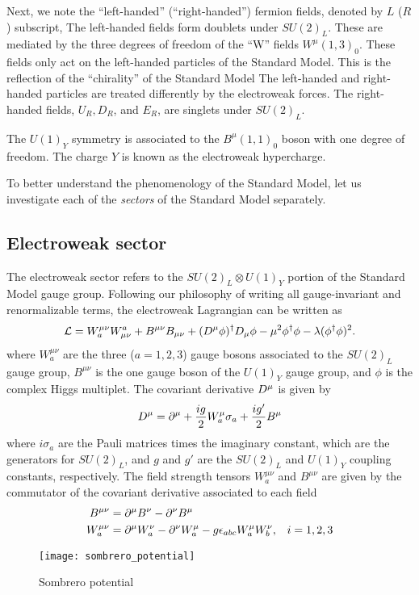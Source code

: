 Next, we note the ``left-handed'' (``right-handed'') fermion fields, denoted by $L$ ($R$) subscript,
The left-handed fields form doublets under $SU(2)_L$.
These are mediated by the three degrees of freedom of the  ``W'' fields $W^\mu(1,3)_0$.
These fields only act on the left-handed particles of the Standard Model.
This is the reflection of the ``chirality'' of the Standard Model
The left-handed and right-handed particles are treated differently by the electroweak forces.
The right-handed fields, $U_R, D_R$, and $E_R$, are singlets under $SU(2)_L$.

The $U(1)_Y$ symmetry is associated to the $B^\mu(1,1)_0$ boson with one degree of freedom.
The charge $Y$ is known as the electroweak hypercharge.

To better understand the phenomenology of the Standard Model, let us investigate each of the \textit{sectors} of the Standard Model separately.

\subsection{Electroweak sector}

The electroweak sector refers to the $SU(2)_L \otimes U(1)_Y$ portion of the Standard Model gauge group.
Following our philosophy of writing all gauge-invariant and renormalizable terms, the electroweak Lagrangian can be written as
\begin{equation}\label{eq:ew_lagr}
\mathcal{L} =  W^{\mu\nu}_a W_{\mu\nu}^a + B^{\mu\nu} B_{\mu\nu} + (D^\mu \phi)^\dagger D_\mu \phi -  \mu^2 \phi^\dagger \phi - \lambda (\phi^\dagger \phi)^2.
\end{equation}
where $W^{\mu\nu}_a$ are the three ($a=1,2,3$) gauge bosons associated to the $SU(2)_L$ gauge group, $B^{\mu\nu}$ is the one gauge boson of the $U(1)_Y$ gauge group, and $\phi$ is the complex Higgs multiplet.
The covariant derivative $D^\mu$ is given by
\begin{equation}
D^\mu = \partial^\mu  + \frac{ig}{2} W^\mu_a \sigma_a + \frac{i g'}{2} B^\mu
\end{equation}
where $i \sigma_a$ are the Pauli matrices times the imaginary constant, which are the generators for $SU(2)_L$, and $g$ and $g'$ are the $SU(2)_L$ and $U(1)_Y$ coupling constants, respectively.
The field strength tensors  $W^{\mu\nu}_a$ and $B^{\mu\nu}$ are given by the commutator of the covariant derivative associated to each field
\begin{align} \label{eq:ew_field_strength_tensor}
B^{\mu\nu}   &=  \partial^\mu B^\nu - \partial^\nu B^\mu & \\
W^{\mu\nu}_a &=  \partial^\mu W^\nu_a - \partial^\nu W^\mu_a - g \epsilon_{abc} W^\mu_a W^\nu_b,& i = 1,2,3 \notag
\end{align}
\begin{figure}
\caption{Sombrero potential}
\label{fig:sombrero}
\texttt{[image: sombrero\_potential]}
\end{figure}

